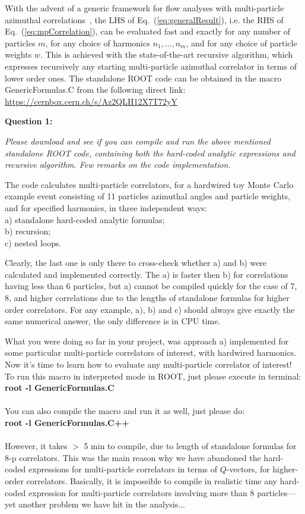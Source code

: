 \documentclass[12pt]{article}
\begin{document}
With the advent of a generic framework for flow analyses with multi-particle azimuthal correlations~\cite{Bilandzic:2013kga}, the LHS of Eq.~(\ref{eq:generalResult}), i.e. the RHS of Eq.~(\ref{eq:mpCorrelation}), can be evaluated fast and exactly for any number of particles $m$, for any choice of harmonics $n_1,\ldots, n_m$, and for any choice of particle weights $w$. This is achieved with the state-of-the-art recursive algorithm, which expresses recursively any starting multi-particle azimuthal correlator in terms of lower order ones. The standalone ROOT code can be obtained in the macro GenericFormulas.C from the following direct link: \url{https://cernbox.cern.ch/s/Az2QLH12X7T72yY}

\vspace{0.5cm}
\noindent\textbf{Question 1:} {\it Please download and see if you can compile and run the above mentioned standalone ROOT code, containing both the hard-coded analytic expressions and recursive algorithm. Few remarks on the code implementation.

The code calculates multi-particle correlators, for a hardwired toy Monte Carlo example event consisting of 11 particles azimuthal angles and particle weights, and for specified harmonics, in three independent ways:\\
a) standalone hard-coded analytic formulas; \\
b) recursion; \\
c) nested loops.

Clearly, the last one is only there to cross-check whether a) and b) were calculated and implemented correctly. The a) is faster then b) for correlations having less than 6 particles, but a) cannot be compiled quickly for the case of 7, 8, and higher correlations due to the lengths of standalone formulas for higher order correlators. For any example, a), b) and c) should always give exactly the same numerical answer, the only difference is in CPU time. 

What you were doing so far in your project, was approach a) implemented for some particular multi-particle correlators of interest, with hardwired harmonics. Now it's time to learn how to evaluate any multi-particle correlator of interest! To run this macro in interpreted mode in ROOT, just please execute in terminal:\\ \textbf{root -l GenericFormulas.C}\\ \\ 
You can also compile the macro and run it as well, just please do:\\ \textbf{root -l GenericFormulas.C++}\\ \\ 
However,  it takes $>$ 5 min to compile, due to length of standalone formulas for 8-p correlators. This was the main reason why we have abandoned the hard-coded expressions for multi-particle correlators in terms of $Q$-vectors, for higher-order correlators. Basically, it is impossible to compile in realistic time any hard-coded expression for multi-particle correlators involving more than 8 particles---yet another problem we have hit in the analysis...

}
\end{document}
